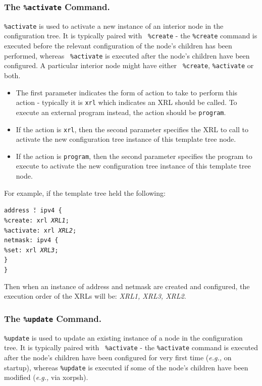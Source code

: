 \documentclass[11pt]{article}
\newcommand{\eg}{\emph{e.g.,}\xspace}
\begin{document}
\subsubsection{The {\tt \%activate} Command.}
{\tt \%activate} is used to activate a new instance of an interior
node in the configuration tree.  It is typically paired with {\tt
\%create} - the {\tt \%create} command is executed before the relevant
configuration of the node's children has been performed, whereas {\tt
\%activate} is executed after the node's children have been
configured.  A particular interior node might have either {\tt
\%create}, {\tt \%activate} or both.

\begin{itemize}

  \item The first parameter indicates the form of action to take to perform
   this action - typically it is {\tt xrl} which indicates an XRL should
   be called.
   To execute an external program instead, the action should be {\tt program}.

  \item If the action is {\tt xrl}, then the second parameter specifies the
   XRL to call to activate the new configuration tree instance of this template
   tree node.

  \item If the action is {\tt program}, then the second parameter specifies the
   program to execute to activate the new configuration tree instance of this
   template tree node.

\end{itemize}

For example, if the template tree held the following:

\begin{tabbing}
\tt addr\=\tt ess \=\tt@: ipv4 \{\\
    \>\tt\%create: xrl {\it XRL1};\\
    \>\tt\%activate: xrl {\it XRL2};\\
    \>\tt netmask: ipv4 \{\\
        \>\>\tt\%set: xrl {\it XRL3};\\
    \>\tt\}\\
\tt\}
\end{tabbing}

Then when an instance of address and netmask are created and
configured, the execution order of the XRLs will be: {\it XRL1, XRL3, XRL2}.

\subsubsection{The {\tt \%update} Command.}
{\tt \%update} is used to update an existing instance of a
node in the configuration tree.  It is typically paired with {\tt
\%activate} - the {\tt \%activate} command is executed
after the node's children have been configured for very first time (\eg on
startup), whereas {\tt \%update} is executed if some of the node's children
have been modified (\eg via xorpsh).
\end{document}
